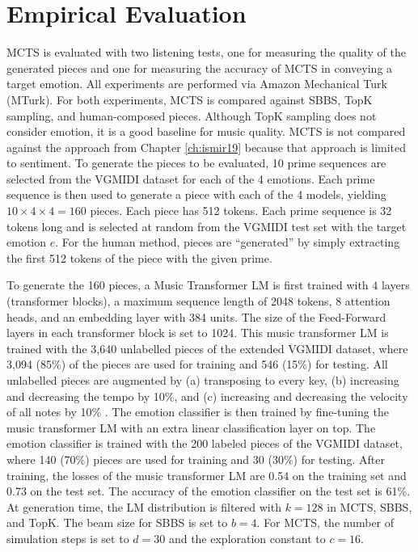 \section{Empirical Evaluation}

MCTS is evaluated with two listening tests, one for measuring the quality of the generated pieces and one for measuring the accuracy of MCTS in conveying a target emotion. All experiments are performed via Amazon Mechanical Turk (MTurk). For both experiments, MCTS is compared against SBBS, TopK sampling, and human-composed pieces. Although TopK sampling does not consider emotion, it is a good baseline for music quality. MCTS is not compared against the approach from Chapter \ref{ch:ismir19} because that approach is limited to sentiment. To generate the pieces to be evaluated, 10 prime sequences are selected from the VGMIDI dataset for each of the 4 emotions. Each prime sequence is then used to generate a piece with each of the 4 models, yielding $10\times4\times4 = 160$ pieces. Each piece has 512 tokens. Each prime sequence is 32 tokens long and is selected at random from the VGMIDI test set with the target emotion $e$. For the human method, pieces are ``generated'' by simply extracting the first 512 tokens of the piece with the given prime.

To generate the 160 pieces, a Music Transformer LM is first trained with 4 layers (transformer blocks), a maximum sequence length of 2048 tokens, 8 attention heads, and an embedding layer with 384 units. The size of the Feed-Forward layers in each transformer block is set to 1024. This music transformer LM is trained with the 3,640 unlabelled pieces of the extended VGMIDI dataset, where 3,094 (85\%) of the pieces are used for training and 546 (15\%) for testing. All unlabelled pieces are augmented by (a) transposing to every key, (b) increasing and decreasing the tempo by 10\%, and (c) increasing and decreasing the velocity of all notes by 10\% \cite{oore2017learning}. The emotion classifier is then trained by fine-tuning the music transformer LM with an extra linear classification layer on top. The emotion classifier is trained with the 200 labeled pieces of the VGMIDI dataset, where 140 (70\%) pieces are used for training and 30 (30\%) for testing. After training, the losses of the music transformer LM are 0.54 on the training set and 0.73 on the test set. The accuracy of the emotion classifier on the test set is 61\%. At generation time, the LM distribution is filtered with $k = 128$ in MCTS, SBBS, and TopK. The beam size for SBBS is set to $b = 4$. For MCTS, the number of simulation steps is set to $d = 30$ and the exploration constant to $c = 16$.

